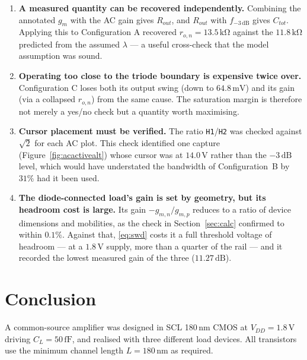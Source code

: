 \documentclass[12pt,a4paper]{article}
\newcommand{\U}[1]{\,\mathrm{#1}}
\begin{document}
\begin{enumerate}[leftmargin=2.2em,itemsep=4pt]
\item \textbf{A measured quantity can be recovered independently.} Combining
the annotated $g_m$ with the AC gain gives $R_{out}$, and $R_{out}$ with
$f_{-3\U{dB}}$ gives $C_{tot}$. Applying this to Configuration A recovered
$r_{o,n}=13.5\U{k\Omega}$ against the $11.8\U{k\Omega}$ predicted from the
assumed $\lambda$ --- a useful cross-check that the model assumption was sound.

\item \textbf{Operating too close to the triode boundary is expensive twice
over.} Configuration C loses both its output swing (down to $64.8\U{mV}$) and
its gain (via a collapsed $r_{o,n}$) from the same cause. The saturation margin
is therefore not merely a yes/no check but a quantity worth maximising.

\item \textbf{Cursor placement must be verified.} The ratio
\texttt{H1}/\texttt{H2} was checked against $\sqrt{2}$ for each AC plot. This
check identified one capture (Figure~\ref{fig:acactivealt}) whose cursor was at
$14.0\U{V}$ rather than the $-3\U{dB}$ level, which would have understated the
bandwidth of Configuration~B by $31\%$ had it been used.

\item \textbf{The diode-connected load's gain is set by geometry, but its
headroom cost is large.} Its gain $-g_{m,n}/g_{m,p}$ reduces to a ratio of
device dimensions and mobilities, as the check in Section~\ref{sec:calc}
confirmed to within $0.1\%$. Against that, \eqref{eq:swd} costs it a full
threshold voltage of headroom --- at a $1.8\U{V}$ supply, more than a quarter
of the rail --- and it recorded the lowest measured gain of the three
($11.27\U{dB}$).

\end{enumerate}

\section{Conclusion}
A common-source amplifier was designed in SCL 180\,nm CMOS at
$V_{DD}=1.8\U{V}$ driving $C_L=50\U{fF}$, and realised with three different
load devices. All transistors use the minimum channel length
$L = 180\U{nm}$ as required.
\end{document}
